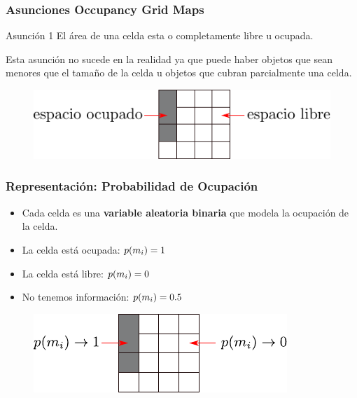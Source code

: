 \begin{frame}
    \frametitle{Asunciones Occupancy Grid Maps}
    
    \begin{block}{Asunción 1}
	    El área de una celda esta o completamente libre u ocupada.
    \end{block}

	Esta asunción no sucede en la realidad ya que puede haber objetos que sean menores que el tamaño de la celda u objetos que cubran parcialmente una celda.
	
  	\begin{figure}[!h]
		\includegraphics[width=0.7\columnwidth]{./images/grid_map.pdf}
	\end{figure}
	
\end{frame}

\begin{frame}
	\frametitle{Representación: Probabilidad de Ocupación}

	\begin{itemize}
	\item Cada celda es una {\bf variable aleatoria binaria} que modela la ocupación de la celda.
	\item La celda está ocupada: $p(m_{i}) = 1$
	\item La celda está libre: $p(m_{i}) = 0$
	\item No tenemos información: $p(m_{i}) = 0.5$
	\end{itemize}
	
	\begin{figure}[!h]
		\includegraphics[width=0.7\columnwidth]{./images/grid_map_representation.pdf}
	\end{figure}
\end{frame}

